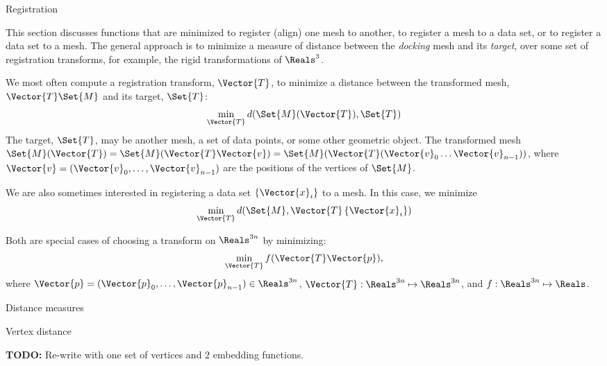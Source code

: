 \begin{plSection}{Registration}
\label{sec:registration}

This section discusses functions that are minimized
to register (align) one mesh to another,
to register a mesh to a data set,
or to register a data set to a mesh.
The general approach is to minimize
a measure of distance between the {\it docking} mesh and its {\it target},
over some set of registration transforms,
for example, the rigid transformations of $\Reals^3$.

We most often compute a registration transform, $\Vector{T}$,
to minimize a distance between the transformed mesh,
$\Vector{T}\Set{M}$ and its target, $\Set{T}$:
\begin{equation}
\min_{\Vector{T}} d(\Set{M}(\Vector{T}),\Set{T})
\end{equation}
The target, $\Set{T}$, may be another mesh, a set of data points,
or some other geometric object.
The transformed mesh
$\Set{M}(\Vector{T})
 = \Set{M}(\Vector{T}\Vector{v}) 
 = \Set{M}(\Vector{T}(\Vector{v}_0 \ldots \Vector{v}_{n-1}))$,
where $\Vector{v} = (\Vector{v}_0, \ldots , \Vector{v}_{n-1})$
are the positions of the vertices of $\Set{M}$.

We are also sometimes interested in registering a data set
$\left\{ \Vector{x}_i \right\}$ to a mesh.
In this case, we minimize
\begin{equation}
\min_{\Vector{T}} d(\Set{M},\Vector{T}\left\{\Vector{x}_i\right\})
\end{equation}

Both are special cases of choosing a transform on $\Reals^{3n}$
by minimizing:
\begin{equation}
\min_{\Vector{T}} f( \Vector{T} \Vector{p}),
\end{equation}
where
$\Vector{p} = (\Vector{p}_0, \ldots , \Vector{p}_{n-1}) \in \Reals^{3n}$,
$\Vector{T} : \Reals^{3n} \mapsto \Reals^{3n}$,
and
$f : \Reals^{3n} \mapsto \Reals$.

\begin{plSection}{Distance measures}
\label{sec:Distance-measures}

\begin{plSection}{Vertex distance}
\label{sec:Vertex-distance}

\textbf{TODO:} Re-write with one set of vertices and $2$
embedding functions.


\end{plSection}
\end{plSection}
\end{plSection}
